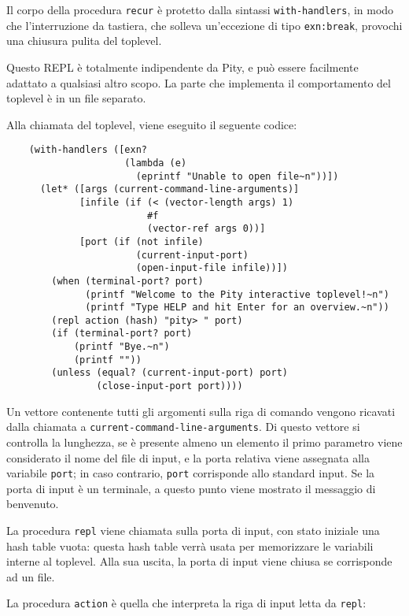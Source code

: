 Il corpo della procedura \lstinline{recur} \`e protetto dalla sintassi
\lstinline{with-handlers}, in modo che l'interruzione da tastiera,
che solleva un'eccezione di tipo \lstinline{exn:break}, provochi
una chiusura pulita del toplevel.

Questo REPL \`e totalmente indipendente da Pity, e pu\`o essere
facilmente adattato a qualsiasi altro scopo. La parte che implementa il
comportamento del toplevel \`e in un file separato.

Alla chiamata del toplevel, viene eseguito il seguente codice:

\begin{lstlisting}
    (with-handlers ([exn?
                     (lambda (e)
                       (eprintf "Unable to open file~n"))])
      (let* ([args (current-command-line-arguments)]
             [infile (if (< (vector-length args) 1)
                         #f
                         (vector-ref args 0))]
             [port (if (not infile)
                       (current-input-port)
                       (open-input-file infile))])
        (when (terminal-port? port)
              (printf "Welcome to the Pity interactive toplevel!~n")
              (printf "Type HELP and hit Enter for an overview.~n"))
        (repl action (hash) "pity> " port)
        (if (terminal-port? port)
            (printf "Bye.~n")
            (printf ""))
        (unless (equal? (current-input-port) port)
                (close-input-port port))))
\end{lstlisting}

Un vettore contenente tutti gli argomenti sulla riga di comando vengono
ricavati dalla chiamata a \lstinline{current-command-line-arguments}. Di
questo vettore si controlla la lunghezza, se \`e presente almeno un
elemento il primo parametro viene considerato il nome del file di input,
e la porta relativa viene assegnata alla variabile \lstinline{port}; in
caso contrario, \lstinline{port} corrisponde allo standard input. Se la
porta di input \`e un terminale, a questo punto viene mostrato il
messaggio di benvenuto.

La procedura \lstinline{repl} viene chiamata sulla porta di input, con
stato iniziale una hash table vuota: questa hash table verr\`a usata per
memorizzare le variabili interne al toplevel. Alla sua uscita, la porta
di input viene chiusa se corrisponde ad un file.

La procedura \lstinline{action} \`e quella che interpreta la riga di
input letta da \lstinline{repl}:


